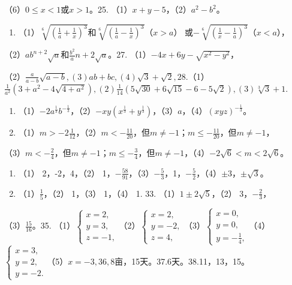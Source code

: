 （6）\(0 \leqslant x < 1\)或\(x > 1\)。25.
（1）\(x + y - 5\)，（2）\(a^2 - b^2\)。

\begin{enumerate}[start=26]
\item
  （1）\(\sqrt[6]{\left(\frac{1}{a} + \frac{1}{x}\right)^3}\)和\(\sqrt[6]{\left(\frac{1}{a} - \frac{1}{x}\right)^3}\)（\(x > a\)）
  或\(-\sqrt[6]{\left(\frac{1}{x} - \frac{1}{a}\right)^3}\)（\(x < a\)），
\end{enumerate}

（2）\(ab^{n+2}\sqrt{a}\)和\(\frac{b^2}{a} n + 2\sqrt{a}\)。27.
（1）\(-4x + 6y - \sqrt{x^2 - y^2}\)，

（2）\(\frac{a}{a - b}\sqrt{a - b}, (3) ab + bc, (4)\sqrt{3} + \sqrt{2}, 28.\)（1）\(\frac{1}{a^2} (3 + a^2 - 4\sqrt{4 + a^2}), (2)\frac{1}{14}(5\sqrt{30} + 6\sqrt{15} - 6 - 5\sqrt{2}), (3)\sqrt[3]{3} + 1.\)

\begin{enumerate}[start=29]
\item
  （1）\(-2a^{\frac{1}{3}}b^{-\frac{1}{3}}\)，（2）\(-xy(x^{\frac{1}{3}} + y^{\frac{1}{3}})\)，（3）\(a\)，（4）\((xyz)^{-\frac{1}{3}}\)。
\item
  （1）\(m > -2\frac{1}{12}\)，（2）\(m < -\frac{11}{20}\)，但\(m \neq -1\)；\(m \leqslant -\frac{11}{20}\)，但\(m \neq -1\)，
\end{enumerate}

（3）\(m < -\frac{2}{4}\)，但\(m \neq -1\)；\(m \leqslant -\frac{3}{4}\)，但\(m \neq -1\)，（4）\(-2\sqrt{6} < m < 2\sqrt{6}\)。

\begin{enumerate}[start=31]
\item
  （1） 2，-2，4，（2）
  1，\(-\frac{58}{91}\)，（3）\(-\frac{5}{3}\)，1，\(-\frac{5}{2}\)，（4）\(\pm 3\)，\(\pm \sqrt{3}\)。
\item
  （1）\(\frac{1}{5}\)，（2） 1，（3） 1，（4） 1. 33.
  （1）\(1 \pm 2\sqrt{5}\)，（2） 3，\(-\frac{2}{3}\)，
\end{enumerate}

（3）\(\frac{15}{16}\)。35.
（1）\(\left\{ \begin{array}{l} x = 2, \\ y = 3, \\ z = -1, \end{array} \right.\)（2）\(\left\{ \begin{array}{l} x = 2, \\ y = -2, \\ z = 4, \end{array} \right.\)（3）\(\left\{ \begin{array}{l} x = 0, \\ y = 0, \\ y = -\frac{1}{4}, \end{array} \right.\)（4）\(\left\{ \begin{array}{l} x = 3, \\ y = 2, \\ y = -2. \end{array} \right.\)（5）\(x = -3, 36, 8\)亩，15天。37.6天。38.11，13，15。

